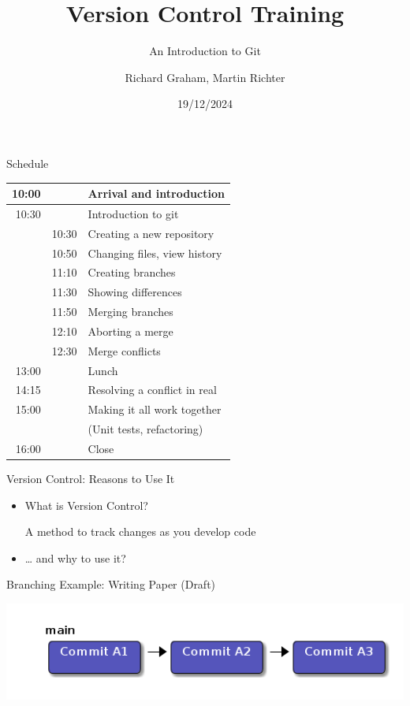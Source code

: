 \documentclass[presentation, smaller, aspectratio=169]{beamer}
\author{Richard Graham, Martin Richter}
\date{19/12/2024}
\title{Version Control Training}
\subtitle{An Introduction to Git}
\begin{document}
\maketitle
\begin{frame}[label={sec:org540ed3e}]{Schedule}
\begin{center}
\begin{tabular}{rrl}
10:00 &  & Arrival and introduction\\
\hline
10:30 &  & Introduction to git\\
 & 10:30 & Creating a new repository\\
 & 10:50 & Changing files, view history\\
 & 11:10 & Creating branches\\
 & 11:30 & Showing differences\\
 & 11:50 & Merging branches\\
 & 12:10 & Aborting a merge\\
 & 12:30 & Merge conflicts\\
\hline
13:00 &  & Lunch\\
\hline
14:15 &  & Resolving a conflict in real\\
\hline
15:00 &  & Making it all work together\\
 &  & (Unit tests, refactoring)\\
\hline
16:00 &  & Close\\
\hline
\end{tabular}
\end{center}
\end{frame}
\begin{frame}[label={sec:org97707ef}]{Version Control: Reasons to Use It}
\begin{itemize}
\item What is Version Control?

A method to track changes as you develop code

\item \ldots{} and why to use it?
\end{itemize}
\end{frame}
\begin{frame}[label={sec:org6aabc51}]{Branching Example: Writing Paper (Draft)}
\begin{center}
\includegraphics[scale=0.3]{figures/main_branch_010.png}
\label{branching_010_paper_draft}
\end{center}
\end{frame}
\end{document}
